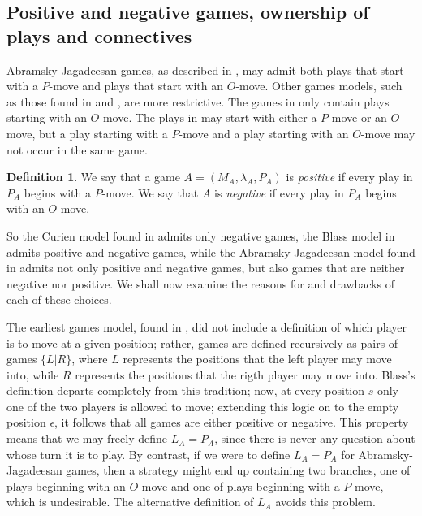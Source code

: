 \documentclass[11pt]{article} %
\theoremstyle{plain} %
\theoremstyle{definition} %
\newtheorem{definition}[theorem]{Definition}
\theoremstyle{exercisestyle}
\newcommand{\emptyplay}{\epsilon}
\begin{document}
\subsection{Positive and negative games, ownership of plays and connectives}

Abramsky-Jagadeesan games, as described in \cite{abramskyjagadeesangames}, may admit both plays that start with a $P$-move and plays that start with an $O$-move.  Other games models, such as those found in \cite{blassgames} and \cite{curiengames}, are more restrictive.  The games in \cite{curiengames} only contain plays starting with an $O$-move.  The plays in \cite{blassgames} may start with either a $P$-move or an $O$-move, but a play starting with a $P$-move and a play starting with an $O$-move may not occur in the same game.

\begin{definition}
  We say that a game $A=(M_A,\lambda_A,P_A)$ is \emph{positive} if every play in $P_A$ begins with a $P$-move.
  We say that $A$ is \emph{negative} if every play in $P_A$ begins with an $O$-move.
\end{definition}

So the Curien model found in \cite{curiengames} admits only negative games, the Blass model in \cite{blassgames} admits positive and negative games, while the Abramsky-Jagadeesan model found in \cite{abramskyjagadeesangames} admits not only positive and negative games, but also games that are neither negative nor positive.  We shall now examine the reasons for and drawbacks of each of these choices.

The earliest games model, found in \cite{conwaygames}, did not include a definition of which player is to move at a given position; rather, games are defined recursively as pairs of games $\{L|R\}$, where $L$ represents the positions that the left player may move into, while $R$ represents the positions that the rigth player may move into.  Blass's definition departs completely from this tradition; now, at every position $s$ only one of the two players is allowed to move; extending this logic on to the empty position $\emptyplay$, it follows that all games are either positive or negative.  This property means that we may freely define $L_A=P_A$, since there is never any question about whose turn it is to play.  By contrast, if we were to define $L_A=P_A$ for Abramsky-Jagadeesan games, then a strategy might end up containing two branches, one of plays beginning with an $O$-move and one of plays beginning with a $P$-move, which is undesirable.  The alternative definition of $L_A$ avoids this problem.
\end{document}
